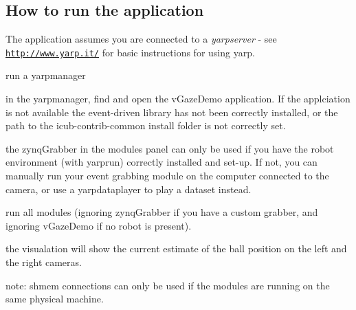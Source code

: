 \subsection*{How to run the application}

The application assumes you are connected to a {\itshape yarpserver} -\/ see \href{http://www.yarp.it/}{\tt http\+://www.\+yarp.\+it/} for basic instructions for using yarp.


\begin{DoxyEnumerate}
\item run a yarpmanager
\item in the yarpmanager, find and open the v\+Gaze\+Demo application. If the applciation is not available the event-\/driven library has not been correctly installed, or the path to the icub-\/contrib-\/common install folder is not correctly set.
\item the zynq\+Grabber in the modules panel can only be used if you have the robot environment (with yarprun) correctly installed and set-\/up. If not, you can manually run your event grabbing module on the computer connected to the camera, or use a yarpdataplayer to play a dataset instead.
\item run all modules (ignoring zynq\+Grabber if you have a custom grabber, and ignoring v\+Gaze\+Demo if no robot is present).
\item the visualation will show the current estimate of the ball position on the left and the right cameras.
\end{DoxyEnumerate}



note\+: shmem connections can only be used if the modules are running on the same physical machine. 